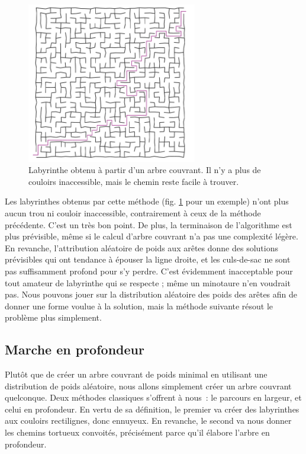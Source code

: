 \documentclass[a4paper, 10pt]{article}
\begin{document}
\begin{figure}[hbt]
  \centering
  \includegraphics[height=7cm]{laby-prim.png}
  \caption{Labyrinthe obtenu à partir d'un arbre couvrant. Il n'y a
    plus de couloirs inaccessible, mais le chemin reste facile à
    trouver.}
  \label{fig:laby-prim}
\end{figure}

Les labyrinthes obtenus par cette méthode (fig. \ref{fig:laby-prim}
pour un exemple) n'ont plus aucun trou ni couloir inaccessible,
contrairement à ceux de la méthode précédente. C'est un très bon
point. De plus, la terminaison de l'algorithme est plus prévisible,
même si le calcul d'arbre couvrant n'a pas une complexité légère. En
revanche, l'attribution aléatoire de poids aux arêtes donne des
solutions prévisibles qui ont tendance à épouser la ligne droite, et
les culs-de-sac ne sont pas suffisamment profond pour s'y
perdre. C'est évidemment inacceptable pour tout amateur de labyrinthe
qui se respecte ; même un minotaure n'en voudrait pas. Nous pouvons
jouer sur la distribution aléatoire des poids des arêtes afin de
donner une forme voulue à la solution, mais la méthode suivante résout
le problème plus simplement.

\subsection*{Marche en profondeur}

Plutôt que de créer un arbre couvrant de poids minimal en utilisant
une distribution de poids aléatoire, nous allons simplement créer un
arbre couvrant quelconque. Deux méthodes classiques s'offrent à nous~:
le parcours en largeur, et celui en profondeur. En vertu de sa
définition, le premier va créer des labyrinthes aux couloirs
rectilignes, donc ennuyeux. En revanche, le second va nous donner les
chemins tortueux convoités, précisément parce qu'il élabore l'arbre en
profondeur.
\end{document}
